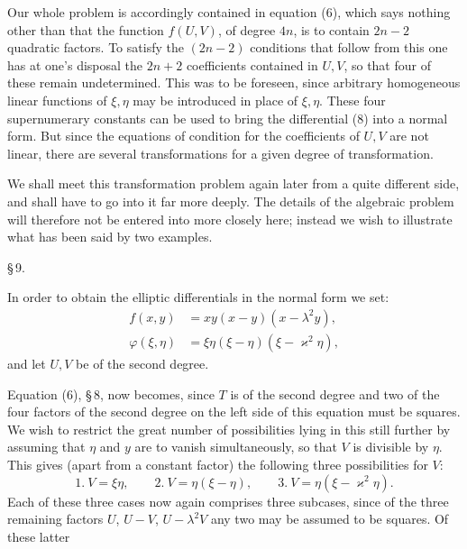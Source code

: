 Our whole problem is accordingly contained in equation (6), which says
nothing other than that the function $f(U,V)$, of degree $4n$, is to
contain $2n-2$ quadratic factors. To satisfy the $(2n-2)$ conditions
that follow from this one has at one's disposal the $2n+2$ coefficients
contained in $U,V$, so that four of these remain undetermined. This was
to be foreseen, since arbitrary homogeneous linear functions of
$\xi,\eta$ may be introduced in place of $\xi,\eta$. These four
supernumerary constants can be used to bring the differential (8) into a
normal form. But since the equations of condition for the coefficients
of $U,V$ are not linear, there are several transformations for a given
degree of transformation.

We shall meet this transformation problem again later from a quite
different side, and shall have to go into it far more deeply. The
details of the algebraic problem will therefore not be entered into more
closely here; instead we wish to illustrate what has been said by two
examples.

\begin{center}
\S\,9. \textbf{}
\end{center}

In order to obtain the elliptic differentials in the normal form we set:
\[
\begin{aligned}
f(x,y) &= xy(x-y)(x-\lambda^2 y),\\
\varphi(\xi,\eta) &= \xi\eta(\xi-\eta)(\xi-\varkappa^2\eta),
\end{aligned}
\]
and let $U, V$ be of the second degree.

Equation (6), \S\,8, now becomes, since $T$ is of the second degree
and two of the four factors of the second degree on the left side of
this equation must be squares. We wish to restrict the great number of
possibilities lying in this still further by assuming that $\eta$ and
$y$ are to vanish simultaneously, so that $V$ is divisible by $\eta$.
This gives (apart from a constant factor) the following three
possibilities for $V$:
\[
1.\ V = \xi\eta, \qquad 2.\ V = \eta(\xi-\eta), \qquad 3.\ V = \eta(\xi-\varkappa^2\eta).
\]
Each of these three cases now again comprises three subcases, since of
the three remaining factors $U$, $U-V$, $U-\lambda^2 V$ any two may be
assumed to be squares. Of these latter
